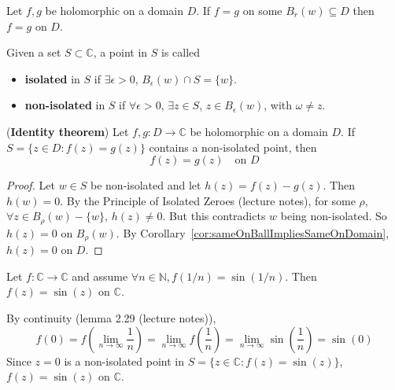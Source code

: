 \begin{corollary}\label{cor:sameOnBallImpliesSameOnDomain}
	Let $f, g$ be holomorphic on a domain $D$. If $f = g$ on some $B_r(w) \subseteq D$ then $f = g$ on $D$.
\end{corollary}

\begin{definition}
	Given a set $S \subset \mathbb{C}$, a point in $S$ is called
	\begin{itemize}
		\item \textbf{isolated} in $S$ if $\exists \epsilon > 0$, $B_{\epsilon}(w) \cap S = \{ w \}$.
		\item \textbf{non-isolated} in $S$ if $\forall \epsilon > 0$, $\exists z \in S$, $z \in B_{\epsilon}(w)$, with $\omega \ne z$.
	\end{itemize}
\end{definition}

\begin{theorem}
	(\textbf{Identity theorem}) Let $f, g: D \rightarrow \mathbb{C}$ be holomorphic on a domain $D$. If $S = \{ z \in D: f(z) = g(z) \}$ contains a non-isolated point, then
	\[
		f(z) = g(z) \quad \text{on } D
	\]
\end{theorem}

\begin{proof}
	Let $w \in S$ be non-isolated and let $h(z) = f(z) - g(z)$. Then $h(w) = 0$. By the Principle of Isolated Zeroes (lecture notes), for some $\rho$, $\forall z \in B_{\rho} (w) - \{ w \}$, $h(z) \ne 0$. But this contradicts $w$ being non-isolated. So $h(z) = 0$ on $B_{\rho} (w)$. By Corollary~\ref{cor:sameOnBallImpliesSameOnDomain}, $h(z) = 0$ on $D$.
\end{proof}

\begin{example}
	Let $f: \mathbb{C} \rightarrow \mathbb{C}$ and assume $\forall n \in \mathbb{N}, f(1 / n) = \sin(1 / n)$. Then $f(z) = \sin(z)$ on $\mathbb{C}$.

	By continuity (lemma 2.29 (lecture notes)),
	\[
		f(0) = f \left( \lim_{n \rightarrow \infty} \frac{1}{n} \right) = \lim_{n \rightarrow \infty} f \left( \frac{1}{n} \right) = \lim_{n \rightarrow \infty} \sin \left( \frac{1}{n} \right) = \sin(0)
	\]
	Since $z = 0$ is a non-isolated point in $S = \{ z \in \mathbb{C}: f(z) = \sin(z) \}$, $f(z) = \sin(z)$ on $\mathbb{C}$.
\end{example}

